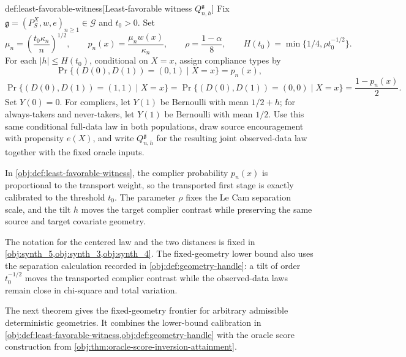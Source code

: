 \begin{definitionv}{def:least-favorable-witness}[Least-favorable witness \(Q_{n,h}^{\mathfrak g}\)]
Fix \(\mathfrak g=(P_S^X,w,e)_{n\ge1}\in\mathcal G\) and \(t_0>0\). Set
\[
\mu_n=\left(\frac{t_0\kappa_n}{n}\right)^{1/2},
\qquad
p_n(x)=\frac{\mu_n w(x)}{\kappa_n},
\qquad
\rho=\frac{1-\alpha}{8},
\qquad
H(t_0)=\min\{1/4,\rho t_0^{-1/2}\}.
\]
For each \(|h|\le H(t_0)\), conditional on \(X=x\), assign compliance types by
\[
\Pr\{(D(0),D(1))=(0,1)\mid X=x\}=p_n(x),
\]
\[
\Pr\{(D(0),D(1))=(1,1)\mid X=x\}
=
\Pr\{(D(0),D(1))=(0,0)\mid X=x\}
=
\frac{1-p_n(x)}{2}.
\]
Set \(Y(0)=0\). For compliers, let \(Y(1)\) be Bernoulli with mean \(1/2+h\); for always-takers and never-takers, let \(Y(1)\) be Bernoulli with mean \(1/2\). Use this same conditional full-data law in both populations, draw source encouragement with propensity \(e(X)\), and write \(Q_{n,h}^{\mathfrak g}\) for the resulting joint observed-data law together with the fixed oracle inputs.
\end{definitionv}

In \cref{obj:def:least-favorable-witness}, the complier probability \(p_n(x)\) is proportional to the transport weight, so the transported first stage is exactly calibrated to the threshold \(t_0\).  The parameter \(\rho\) fixes the Le Cam separation scale, and the tilt \(h\) moves the target complier contrast while preserving the same source and target covariate geometry.

The notation for the centered law and the two distances is fixed in \cref{obj:synth_5,obj:synth_3,obj:synth_4}.  The fixed-geometry lower bound also uses the separation calculation recorded in \cref{obj:def:geometry-handle}: a tilt of order \(t_0^{-1/2}\) moves the transported complier contrast while the observed-data laws remain close in chi-square and total variation.

The next theorem gives the fixed-geometry frontier for arbitrary admissible deterministic geometries.  It combines the lower-bound calibration in \cref{obj:def:least-favorable-witness,obj:def:geometry-handle} with the oracle score construction from \cref{obj:thm:oracle-score-inversion-attainment}.

